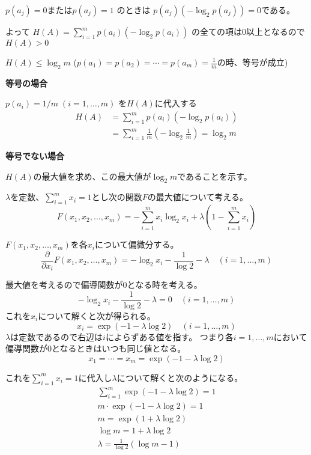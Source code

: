 \documentclass[12pt,b5paper]{ltjsarticle}
\begin{document}
$p(a_j)=0$または$p(a_j)=1$ のときは
$p(a_j)(-\log_{2}{p(a_j)})=0$である。

よって
$H(A) = \sum_{i=1}^{m} p(a_i) \left( -\log_{2}{p(a_i)} \right)$
の全ての項は0以上となるので
$H(A)>0$


\dotfill

$H(A) \leq \log_{2}{m}$ ($p(a_1)=p(a_2)=\cdots =p(a_m)=\frac{1}{m}$の時、等号が成立)

\textbf{等号の場合}

$p(a_i)=1/m \;(i=1,\dots,m)$
を$H(A)$に代入する
\begin{align}
 H(A) &= \sum_{i=1}^{m} p(a_i) \left( -\log_{2}{p(a_i)} \right)\\
 &= \sum_{i=1}^{m} \frac{1}{m} \left( -\log_{2}{\frac{1}{m}} \right)
 = \log_{2}{m}
\end{align}

\textbf{等号でない場合}

$H(A)$の最大値を求め、この最大値が$\log_{2}{m}$であることを示す。

\dotfill
[ラグランジュの未定係数法]
\dotfill

$\lambda$を定数、$\sum_{i=1}^{m}x_i =1$とし次の関数$F$の最大値について考える。
\begin{equation}
 F(x_1,x_2,\dots,x_m) = -\sum_{i=1}^{m}x_i\log_{2}{x_i} + \lambda \left(1- \sum_{i=1}^{m}x_i\right)
\end{equation}

$F(x_1,x_2,\dots,x_m)$を各$x_i$について偏微分する。
\begin{equation}
 \frac{\partial}{\partial x_i} F(x_1,x_2,\dots,x_m) = -\log_2{x_i} -\frac{1}{\log{2}} -\lambda
  \quad (i=1,\dots,m)
\end{equation}

最大値を考えるので偏導関数が0となる時を考える。
\begin{equation}
 -\log_2{x_i} -\frac{1}{\log{2}} -\lambda = 0
  \quad (i=1,\dots,m)
\end{equation}
これを$x_i$について解くと次が得られる。
\begin{equation}
 x_i = \exp (-1-\lambda \log{2})
  \quad (i=1,\dots,m)\label{064805_20Apr22}
\end{equation}
$\lambda$は定数であるので右辺は$i$によらずある値を指す。
つまり各$i=1,\dots,m$において偏導関数が0となるときはいつも同じ値となる。
\begin{equation}
 x_1=\cdots = x_m = \exp (-1-\lambda \log{2})
\end{equation}

これを$\sum_{i=1}^{m}x_i=1$に代入し$\lambda$について解くと次のようになる。
\begin{gather}
 \sum_{i=1}^{m} \exp (-1-\lambda \log{2})=1\\
 m \cdot \exp (-1-\lambda \log{2})=1\\
 m = \exp (1+\lambda \log{2})\\
 \log{m} = 1+\lambda \log{2}\\
 \lambda = \frac{1}{\log{2}} \left( \log{m}-1 \right)\label{064741_20Apr22}
\end{gather}
\end{document}
